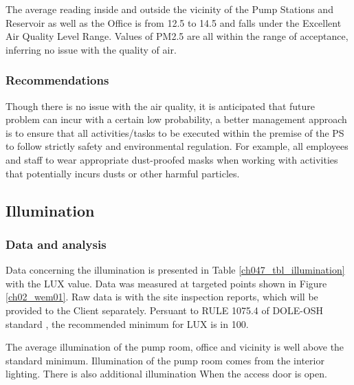

The average reading inside and outside the vicinity of the Pump Stations and Reservoir as well as the Office is from 12.5 to 14.5 and falls under the Excellent Air Quality Level Range. Values of PM2.5 are all within the range of acceptance, inferring no issue with the quality of air. 


\subsubsection{Recommendations}

Though there is no issue with the air quality, it is anticipated that future problem can incur with a certain low probability, a better management approach is to ensure that all activities/tasks to be executed within the premise of the PS to follow strictly safety and environmental regulation. For example, all employees and staff to wear appropriate dust-proofed masks when working with activities that potentially incurs dusts or other harmful particles.



\subsection{Illumination}\label{aq03}
\subsubsection{Data and analysis}
Data concerning the illumination is presented in Table \ref{ch047_tbl_illumination} with the LUX value. Data was measured at targeted points shown in Figure \ref{ch02_wem01}. Raw data is with the site inspection reports, which will be provided to the Client separately. Persuant to RULE 1075.4 of DOLE-OSH standard \cite{DOLE2016}, the recommended minimum for LUX is in 100.



The average illumination of the pump room, office and vicinity is well above the standard minimum. Illumination of the pump room comes from the interior lighting. There is also additional illumination When the access door is open. 

